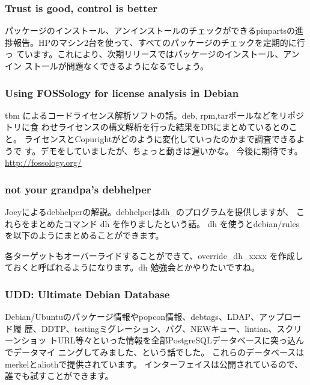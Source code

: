 \documentclass[mingoth,a4paper]{jsarticle}
\begin{document}
\subsubsection{Trust is good, control is better}

パッケージのインストール、アンインストールのチェックができるpiupartsの進
捗報告。HPのマシン2台を使って、すべてのパッケージのチェックを定期的に行っ
ています。これにより、次期リリースではパッケージのインストール、アンイン
ストールが問題なくできるようになるでしょう。

\subsubsection{Using FOSSology for license analysis in Debian} 

tbm によるコードライセンス解析ソフトの話。deb, rpm,tarボールなどをリポジトリに食
わせライセンスの構文解析を行った結果をDBにまとめているとのこと。
ライセンスとCopurightがどのように変化していったのかまで調査できるようで
す。デモをしていましたが、ちょっと動きは遅いかな。
今後に期待です。\url{http://fossology.org/}

\subsubsection{not your grandpa's debhelper}

Joeyによるdebhelperの解説。debhelperはdh\_\*のプログラムを提供しますが、
これらをまとめたコマンド dh を作りましたという話。
dh を使うとdebian/rules を以下のようにまとめることができます。
各ターゲットもオーバーライドすることができて、override\_dh\_xxxx を作成し
ておくと呼ばれるようになります。dh 勉強会とかやりたいですね。

\subsubsection{UDD: Ultimate Debian Database}
Debian/Ubuntuのパッケージ情報やpopcon情報、debtags、LDAP、アップロード履
歴、DDTP、testingミグレーション、バグ、NEWキュー、lintian、スクリーンショッ
トURL等々といった情報を全部PostgreSQLデータベースに突っ込んでデータマイ
ニングしてみました、という話でした。
これらのデータベースはmerkelとaliothで提供されています。
インターフェイスは公開されているので、誰でも試すことができます。
\end{document}
